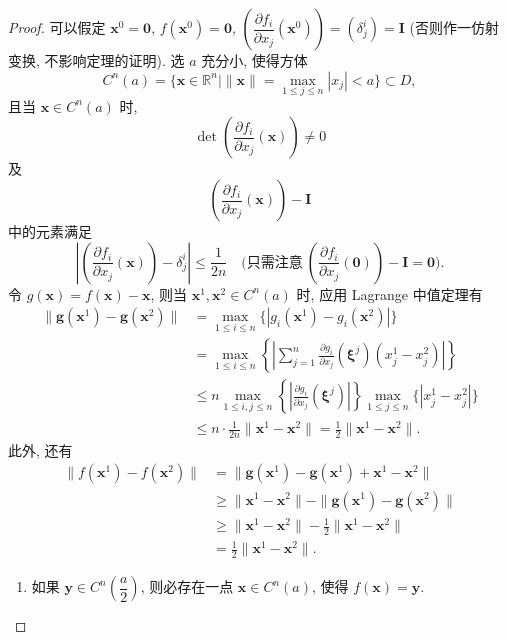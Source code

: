 \begin{proof}
可以假定 $\boldsymbol{x}^{0} = \boldsymbol{0}$, $f(\boldsymbol{x}^{0}) = \boldsymbol{0}$, $\left(\dfrac{\partial f_{i}}{\partial x_{j}}(\boldsymbol{x}^{0})\right) = (\delta_{j}^{i}) = \boldsymbol{I}$ (否则作一仿射变换, 不影响定理的证明). 选 $a$ 充分小, 使得方体
\[
  C^{n}(a) = \bigl\{\boldsymbol{x} \in \mathbb{R}^{n} \mid \|\boldsymbol{x}\| = \max_{1 \leqslant j \leqslant n}|x_{j}| < a\bigr\} \subset D,
\]
且当 $\boldsymbol{x} \in C^{n}(a)$ 时,
\[
  \det\left(\frac{\partial f_{i}}{\partial x_{j}}(\boldsymbol{x})\right) \neq 0
\]
及
\[
  \left(\frac{\partial f_{i}}{\partial x_{j}}(\boldsymbol{x})\right) - \boldsymbol{I}
\]
中的元素满足
\[
  \left|\left(\frac{\partial f_{i}}{\partial x_{j}}(\boldsymbol{x})\right) - \delta_{j}^{i}\right| \leqslant \frac{1}{2n}
  \quad \biggl(\text{只需注意}\ \left(\frac{\partial f_{i}}{\partial x_{j}}(\boldsymbol{0})\right) - \boldsymbol{I} = \boldsymbol{0}\biggr).
\]
令 $g(\boldsymbol{x}) = f(\boldsymbol{x}) - \boldsymbol{x}$, 则当 $\boldsymbol{x}^{1}, \boldsymbol{x}^{2} \in C^{n}(a)$ 时, 应用 Lagrange 中值定理有
\begin{align*}
  \|\boldsymbol{g}(\boldsymbol{x}^{1}) - \boldsymbol{g}(\boldsymbol{x}^{2})\| &= \max_{1 \leqslant i \leqslant n}\bigl\{|g_{i}(\boldsymbol{x}^{1}) - g_{i}(\boldsymbol{x}^{2})|\bigr\} \\
  &= \max_{1 \leqslant i \leqslant n}\left\{\left|\sum_{j=1}^{n}\frac{\partial g_{i}}{\partial x_{j}}(\boldsymbol{\xi}^{j})(x_{j}^{1} - x_{j}^{2})\right|\right\} \\
  &\leqslant n\max_{1 \leqslant i, j \leqslant n}\left\{\left|\frac{\partial g_{i}}{\partial x_{j}}(\boldsymbol{\xi}^{j})\right|\right\}\max_{1 \leqslant j \leqslant n}\bigl\{|x_{j}^{1} - x_{j}^{2}|\bigr\} \\
  &\leqslant n \cdot \frac{1}{2n}\|\boldsymbol{x}^{1} - \boldsymbol{x}^{2}\| = \frac{1}{2}\|\boldsymbol{x}^{1} - \boldsymbol{x}^{2}\|.
\end{align*}
此外, 还有
\begin{align*}
  \|f(\boldsymbol{x}^{1}) - f(\boldsymbol{x}^{2})\| &= \|\boldsymbol{g}(\boldsymbol{x}^{1}) - \boldsymbol{g}(\boldsymbol{x}^{1}) + \boldsymbol{x}^{1} - \boldsymbol{x}^{2}\| \\
  &\geqslant \|\boldsymbol{x}^{1} - \boldsymbol{x}^{2}\| - \|\boldsymbol{g}(\boldsymbol{x}^{1}) - \boldsymbol{g}(\boldsymbol{x}^{2})\| \\
  &\geqslant \|\boldsymbol{x}^{1} - \boldsymbol{x}^{2}\| - \frac{1}{2}\|\boldsymbol{x}^{1} - \boldsymbol{x}^{2}\| \\
  &= \frac{1}{2}\|\boldsymbol{x}^{1} - \boldsymbol{x}^{2}\|.
\end{align*}
\begin{enumerate}
\item[(1)] 如果 $\boldsymbol{y} \in C^{n}\left(\dfrac{a}{2}\right)$, 则必存在一点 $\boldsymbol{x} \in C^{n}(a)$, 使得 $f(\boldsymbol{x}) = \boldsymbol{y}$.


\end{enumerate}
\end{proof}
